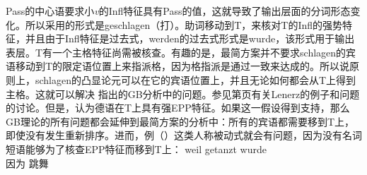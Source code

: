 Pass的中心语要求小\emph{v}的Infl特征具有Pass的值，这就导致了输出层面的分词形态变化。所以采用的形式是geschlagen（打）。助词移动到T，来核对T的Infl的强势特征，并且由于Infl特征是过去式，werden的过去式形式是wurde，该形式用于输出表层。T有一个主格特征尚需被核查。有趣的是，最简方案并不要求schlagen的宾语移动到T的限定语位置上来指派格，因为格指派是通过一致来达成的。所以说原则上，schlagen的凸显论元可以在它的宾语位置上，并且无论如何都会从T上得到主格。这就可以解决 \citet[\S~4.4.3]{Lenerz77}指出的GB分析中的问题。参见第\pageref{ex-passive-German-no-movement}页有关Lenerz的例子和问题的讨论。但是，\citet[]{Adger2003a}认为德语在T上具有强EPP特征。如果这一假设得到支持，那么GB理论的所有问题都会延伸到最简方案的分析中：所有的宾语都需要移到T上，即使没有发生重新排序。进而，例（）这类人称被动式就会有问题，因为没有名词短语能够为了核查EPP特征而移到T上：
\ea
\gll weil getanzt wurde\\
     因为 跳舞 \passivepst{}\\
\z
{}

